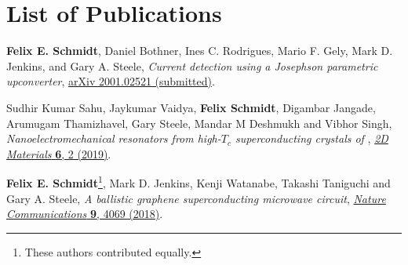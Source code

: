 \chapter*{List of Publications}
\label{publications}

\renewcommand*{\thefootnote}{\fnsymbol{footnote}}
\setcounter{footnote}{0}

\begin{etaremune}{\small



\item \textbf{Felix E. Schmidt}, Daniel Bothner, Ines C. Rodrigues, Mario F. Gely, Mark D. Jenkins, and Gary A. Steele, \textit{Current detection using a Josephson parametric upconverter}, \href{https://arxiv.org/abs/2001.02521}{arXiv 2001.02521 (submitted)}.

\item Sudhir Kumar Sahu, Jaykumar Vaidya, \textbf{Felix Schmidt}, Digambar Jangade, Arumugam Thamizhavel, Gary Steele, Mandar M Deshmukh and Vibhor Singh, \textit{Nanoelectromechanical resonators from high-$T_c$ superconducting crystals of }, \href{https://doi.org/10.1088/2053-1583/ab0800}{\textit{2D Materials} \textbf{6}, 2 (2019)}.

\item \textbf{Felix E. Schmidt}\footnote{\label{foot:equal}These authors contributed equally.}, Mark D. Jenkins, Kenji Watanabe, Takashi Taniguchi and Gary A. Steele, \textit{A ballistic graphene superconducting microwave circuit}, \href{https://doi.org/10.1038/s41467-018-06595-2}{\textit{Nature Communications} \textbf{9}, 4069 (2018)}.

}\end{etaremune}

\renewcommand*{\thefootnote}{\arabic{footnote}}
